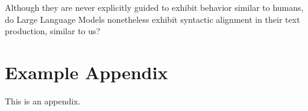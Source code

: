 \documentclass[11pt]{article}
\begin{document}
Although they are never explicitly guided to exhibit behavior similar to humans, do Large Language Models nonetheless exhibit syntactic alignment in their text production, similar to us?


%


\appendix

\section{Example Appendix}
\label{sec:appendix}

This is an appendix.
\end{document}
